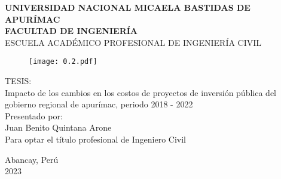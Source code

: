 
\begin{titlepage}

	\begin{center}
		\textbf{\large{UNIVERSIDAD NACIONAL MICAELA BASTIDAS DE APURÍMAC}}\\
		\vspace{2mm}
		\normalsize{\textbf{FACULTAD DE INGENIERÍA}}\\
		\vspace{2mm}
		\normalsize{ESCUELA ACADÉMICO PROFESIONAL DE INGENIERÍA CIVIL}\\
		\vspace{5mm}
		\begin{figure}[h!]
			\centering
			\texttt{[image: 0.2.pdf]}
		\end{figure}
		
		\vspace{5mm}
		TESIS:\\
		Impacto de los cambios en los costos de proyectos de inversión pública del gobierno regional de apurímac, periodo 2018 - 2022\\
		\vspace{10mm}
		Presentado por:\\
		\vspace{10mm}
		Juan Benito Quintana Arone\\
		\vspace{5mm}
		Para optar el título profesional de Ingeniero Civil 
		
		\vspace{10mm}
		
		\vfill
		Abancay, Perú\\
		\vspace{5mm}
		2023\\
	\end{center}
\end{titlepage}

